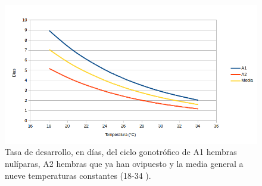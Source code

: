 \begin{figure}
    \centering
    \includegraphics[width=1\textwidth]{capitulo-6/graphics/ciclo-gonotrofico-temperatura.png}
    \caption{\label{fig:ciclo-gonotrofico-temperatura} Tasa de desarrollo, en días, del ciclo gonotrófico
    de A1 hembras nulíparas, A2 hembras que ya han ovipuesto y la media general a nueve temperaturas
    constantes (18-34 \textcelsius).}
\end{figure}

